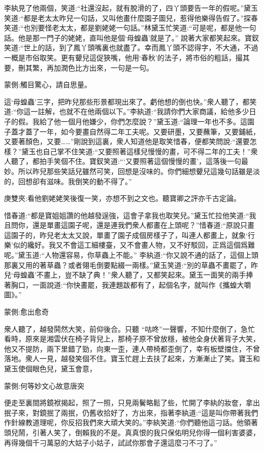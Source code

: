 \begin{parag}
    李紈見了他兩個，笑道:“社還沒起，就有脫滑的了，四丫頭要告一年的假呢。”黛玉笑道:“都是老太太昨兒一句話，又叫他畫什麼園子圖兒，惹得他樂得告假了。”探春笑道:“也別要怪老太太，都是劉姥姥一句話。”林黛玉忙笑道:“可是呢，都是他一句話。他是那一門子的姥姥，直叫他是個‘母蝗蟲’就是了。” 說著大家都笑起來。寶釵笑道:“世上的話，到了鳳丫頭嘴裏也就盡了。幸而鳳丫頭不認得字，不大通，不過一概是市俗取笑。更有顰兒這促狹嘴，他用‘春秋’的法子，將市俗的粗話，撮其要，刪其繁，再加潤色比方出來，一句是一句。\begin{note}蒙側:觸目驚心，請自思量。\end{note}這‘母蝗蟲’三字，把昨兒那些形景都現出來了。虧他想的倒也快。”衆人聽了，都笑道:“你這一註解，也就不在他兩個以下。”李紈道:“我請你們大家商議，給他多少日子的假。我給了他一個月他嫌少，你們怎麼說？”黛玉道:“論理一年也不多。這園子蓋才蓋了一年，如今要畫自然得二年工夫呢。又要研墨，又要蘸筆，又要鋪紙，又要著顏色，又要……”剛說到這裏，衆人知道他是取笑惜春，便都笑問說:“還要怎樣？”黛玉也自己掌不住笑道:“又要照著這樣兒慢慢的畫，可不得二年的工夫！”衆人聽了，都拍手笑個不住。寶釵笑道:“‘又要照著這個慢慢的畫’，這落後一句最妙。所以昨兒那些笑話兒雖然可笑，回想是沒味的。你們細想顰兒這幾句話雖是淡的，回想卻有滋味。我倒笑的動不得了。”\begin{note}庚雙夾:看他劉姥姥笑後復一笑，亦想不到之文也。聽寶卿之評亦千古定論。\end{note}惜春道:“都是寶姐姐讚的他越發逞強，這會子拿我也取笑兒。”黛玉忙拉他笑道:“我且問你，還是單畫這園子呢，還是連我們衆人都畫在上頭呢？”惜春道:“原說只畫這園子的，昨兒老太太又說，單畫了園子成個房樣子了，叫連人都畫上，就象‘行樂’似的纔好。我又不會這工細樓臺，又不會畫人物，又不好駁回，正爲這個爲難呢。”黛玉道:“人物還容易，你草蟲上不能。” 李紈道:“你又說不通的話了，這個上頭那裏又用的著草蟲？或者翎毛倒要點綴一兩樣。”黛玉笑道:“別的草蟲不畫罷了，昨兒‘母蝗蟲’不畫上，豈不缺了典！”衆人聽了，又都笑起來。黛玉一面笑的兩手捧著胸口，一面說道:“你快畫罷，我連題跋都有了，起個名字，就叫作《攜蝗大嚼圖》。”\begin{note}蒙側:愈出愈奇\end{note}衆人聽了，越發鬨然大笑，前仰後合。只聽 “咕咚”一聲響，不知什麼倒了，急忙看時，原來是湘雲伏在椅子背兒上，那椅子原不曾放穩，被他全身伏著背子大笑，他又不提防，兩下里錯了勁，向東一歪，連人帶椅都歪倒了，幸有板壁擋住，不曾落地。衆人一見，越發笑個不住。寶玉忙趕上去扶了起來，方漸漸止了笑。寶玉和黛玉使個眼色兒，黛玉會意，\begin{note}蒙側:何等妙文心故意唐突\end{note}便走至裏間將鏡袱揭起，照了一照，只見兩鬢略鬆了些，忙開了李紈的妝奩，拿出抿子來，對鏡抿了兩抿，仍舊收拾好了，方出來，指著李紈道:“這是叫你帶著我們作針線教道理呢，你反招我們來大頑大笑的。”李紈笑道:“你們聽他這刁話。他領著頭兒鬧，引著人笑了，倒賴我的不是。真真恨的我只保佑明兒你得一個利害婆婆，再得幾個千刁萬惡的大姑子小姑子，試試你那會子還這麼刁不刁了。”
\end{parag}


